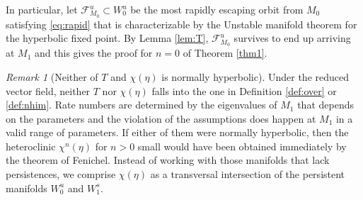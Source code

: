 \documentclass[a4paper,11pt]{article}
\newtheorem{lemma}{Lemma}[section]
\theoremstyle{remark}
\newtheorem{remark}{Remark}[section]
\begin{document}
In particular, let $\mathcal{F}^u_{M_0}\subset W^u_0$ be the most rapidly escaping orbit from $M_0$ satisfying \eqref{eq:rapid} that is characterizable by the Unstable manifold theorem for the hyperbolic fixed point. By Lemma \ref{lem:T}, $\mathcal{F}^u_{M_0}$ survives to end up arriving at $M_1$ and this gives the proof for $n=0$ of Theorem \ref{thm1}.
\begin{remark}[Neither of $T$ and $\chi(\eta)$ is normally hyperbolic]
Under the reduced vector field, neither $T$ nor $\chi(\eta)$ falls into the one in Definition \ref{def:over} or \ref{def:nhim}. Rate numbers are determined by the eigenvalues of $M_1$ that depends on the parameters and the violation of the assumptions does happen at $M_1$ in a valid range of parameters. If either of them were normally hyperbolic, then the heteroclinic $\chi^n(\eta)$ for $n>0$ small would have been obtained immediately by the theorem of Fenichel. Instead of working with those manifolds that lack persistences, we comprise $\chi(\eta)$ as a transversal intersection of the persistent manifolds $W_0^u$ and $W_1^s$.  %
%
%
\end{remark}

% 
% 
\end{document}
